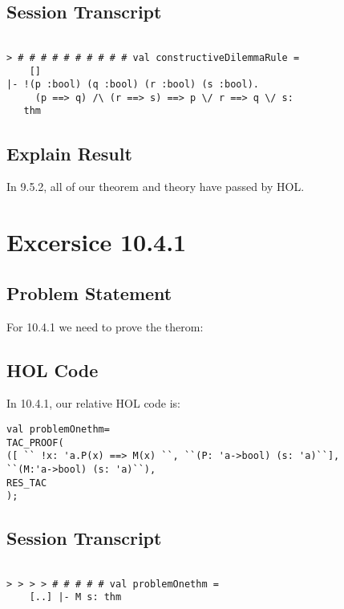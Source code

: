 \documentclass{report}
\begin{document}
\section{Session Transcript}
\label{Session Trans 952}
\setcounter{sessioncount}{0}
\begin{session}
  \begin{scriptsize}
\begin{verbatim}

> # # # # # # # # # # val constructiveDilemmaRule =
    []
|- !(p :bool) (q :bool) (r :bool) (s :bool).
     (p ==> q) /\ (r ==> s) ==> p \/ r ==> q \/ s:
   thm
\end{verbatim}
  \end{scriptsize}
\end{session}
\section{Explain Result}
\label{explain result 952}
In 9.5.2, all of our theorem and theory have passed by HOL.


\chapter{Excersice 10.4.1}
\label{Ex 1041}
\section{Problem Statement}
\label{Problem State 1041}
For 10.4.1 we need to prove the therom:
\HOLexerciseOneZeroTheoremsproblemOnethm


\section{HOL Code}
\label{HOl Code 1041}
In 10.4.1, our relative HOL code is:
\begin{lstlisting}[frame=trBL]
val problemOnethm=
TAC_PROOF(
([ `` !x: 'a.P(x) ==> M(x) ``, ``(P: 'a->bool) (s: 'a)``],
``(M:'a->bool) (s: 'a)``),
RES_TAC
);
\end{lstlisting}

\section{Session Transcript}
\label{Session Trans 1041}
\setcounter{sessioncount}{0}
\begin{session}
  \begin{scriptsize}
\begin{verbatim}

> > > > # # # # # val problemOnethm =
    [..] |- M s: thm
\end{verbatim}
  \end{scriptsize}
\end{session}
\end{document}
